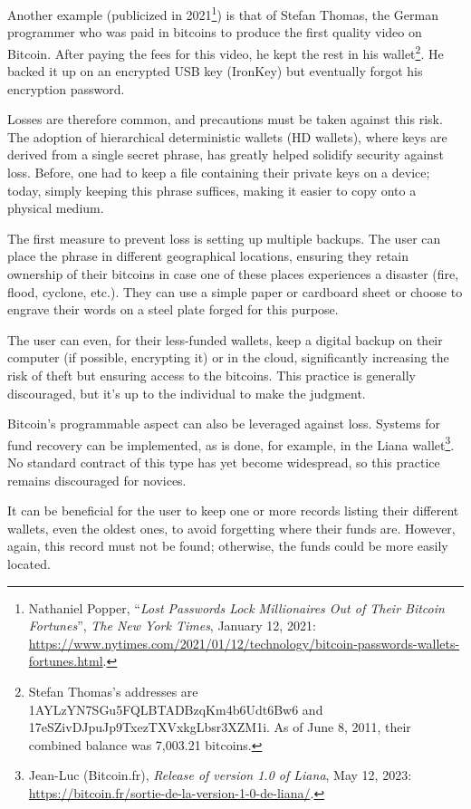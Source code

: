 \documentclass[
  a5paper,
  smalldemyvopaper,10pt,twoside,onecolumn,openright,extrafontsizes,hidelinks]{memoir}
\begin{document}
Another example (publicized in 2021\footnote{Nathaniel Popper,
  ``\emph{Lost Passwords Lock Millionaires Out of Their Bitcoin
  Fortunes}'', \emph{The New York Times}, January 12, 2021:
  \url{https://www.nytimes.com/2021/01/12/technology/bitcoin-passwords-wallets-fortunes.html}.})
is that of Stefan Thomas, the German programmer who was paid in bitcoins
to produce the first quality video on Bitcoin. After paying the fees for
this video, he kept the rest in his wallet\footnote{Stefan Thomas's
  addresses are 1AYLzYN7SGu5FQLBTADBzqKm4b6Udt6Bw6 and
  17eSZivDJpuJp9TxezTXVxkgLbsr3XZM1i. As of June 8, 2011, their combined
  balance was 7,003.21 bitcoins.}. He backed it up on an encrypted USB
key (IronKey) but eventually forgot his encryption password.

Losses are therefore common, and precautions must be taken against this
risk. The adoption of hierarchical deterministic wallets (HD wallets),
where keys are derived from a single secret phrase, has greatly helped
solidify security against loss. Before, one had to keep a file
containing their private keys on a device; today, simply keeping this
phrase suffices, making it easier to copy onto a physical medium.

The first measure to prevent loss is setting up multiple backups. The
user can place the phrase in different geographical locations, ensuring
they retain ownership of their bitcoins in case one of these places
experiences a disaster (fire, flood, cyclone, etc.). They can use a
simple paper or cardboard sheet or choose to engrave their words on a
steel plate forged for this purpose.

The user can even, for their less-funded wallets, keep a digital backup
on their computer (if possible, encrypting it) or in the cloud,
significantly increasing the risk of theft but ensuring access to the
bitcoins. This practice is generally discouraged, but it's up to the
individual to make the judgment.

Bitcoin's programmable aspect can also be leveraged against loss.
Systems for fund recovery can be implemented, as is done, for example,
in the Liana wallet\footnote{Jean-Luc (Bitcoin.fr), \emph{Release of
  version 1.0 of Liana}, May 12, 2023:
  \url{https://bitcoin.fr/sortie-de-la-version-1-0-de-liana/}.}. No
standard contract of this type has yet become widespread, so this
practice remains discouraged for novices.

It can be beneficial for the user to keep one or more records listing
their different wallets, even the oldest ones, to avoid forgetting where
their funds are. However, again, this record must not be found;
otherwise, the funds could be more easily located.
\end{document}

